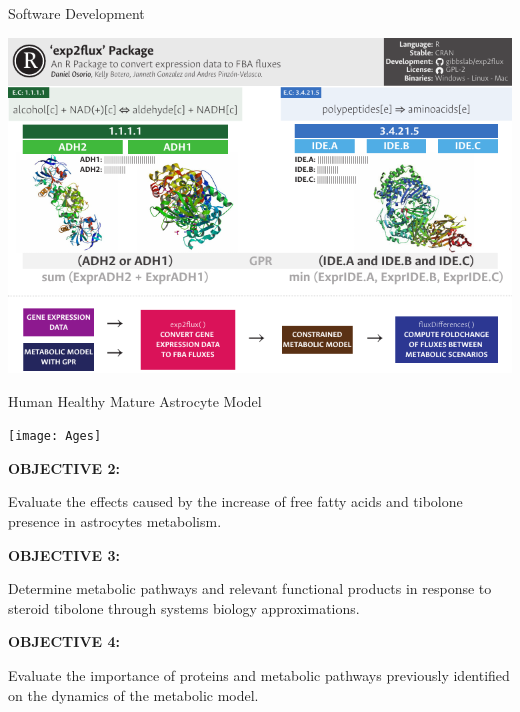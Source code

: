 \documentclass[11pt]{beamer}
\begin{document}
\begin{frame}{Software Development}
\begin{center}
\includegraphics[width=\textwidth]{exp2flux}
\end{center}
\end{frame}
\begin{frame}{Human Healthy Mature Astrocyte Model}
\begin{center}
\texttt{[image: Ages]}
\end{center}
\end{frame}
\begin{frame}
\begin{block}{\textbf{OBJECTIVE 2:}}
\begin{center}
Evaluate the effects caused by the increase of free fatty acids and tibolone presence in astrocytes metabolism.\end{center}\end{block}
\end{frame}
\begin{frame}
\begin{block}{\textbf{OBJECTIVE 3:}}
\begin{center}
Determine metabolic pathways and relevant functional products in response to steroid tibolone through systems biology approximations.\end{center}\end{block}
\end{frame}
\begin{frame}
\begin{block}{\textbf{OBJECTIVE 4:}}
\begin{center}
Evaluate the importance of proteins and metabolic pathways previously identified on the dynamics of the metabolic model.\end{center}\end{block}
\end{frame}
\end{document}
